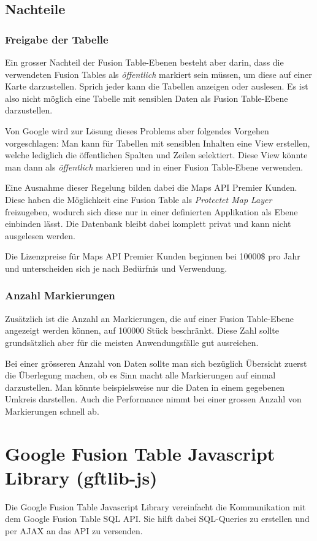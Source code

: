 \subsection{Nachteile}
\subsubsection{Freigabe der Tabelle}
Ein grosser Nachteil der Fusion Table-Ebenen besteht aber darin, dass die verwendeten Fusion Tables als  \emph{öffentlich} markiert sein müssen, um diese auf einer Karte darzustellen. Sprich jeder kann die Tabellen anzeigen oder auslesen. Es ist also nicht möglich eine Tabelle mit sensiblen Daten als Fusion Table-Ebene darzustellen.

Von Google wird zur Lösung dieses Problems aber folgendes Vorgehen vorgeschlagen: Man kann für Tabellen mit sensiblen Inhalten eine View erstellen, welche lediglich die öffentlichen Spalten und Zeilen selektiert. Diese View könnte man dann als \emph{öffentlich} markieren und in einer Fusion Table-Ebene verwenden.

Eine Ausnahme dieser Regelung bilden dabei die Maps API Premier Kunden. Diese haben die Möglichkeit eine Fusion Table als \emph{Protectet Map Layer} freizugeben, wodurch sich diese nur in einer definierten Applikation als Ebene einbinden lässt. Die Datenbank bleibt dabei komplett privat und kann nicht ausgelesen werden.

Die Lizenzpreise für Maps API Premier Kunden beginnen bei 10000\$ pro Jahr und unterscheiden sich je nach Bedürfnis und Verwendung. 

\subsubsection{Anzahl Markierungen}
Zusätzlich ist die Anzahl an Markierungen, die auf einer Fusion Table-Ebene angezeigt werden können, auf 100000 Stück beschränkt. Diese Zahl sollte grundsätzlich aber für die meisten Anwendungsfälle gut ausreichen.

Bei einer grösseren Anzahl von Daten sollte man sich bezüglich Übersicht zuerst die Überlegung machen, ob es Sinn macht alle Markierungen auf einmal darzustellen. Man könnte beispielsweise nur die Daten in einem gegebenen Umkreis darstellen. Auch die Performance nimmt bei einer grossen Anzahl von Markierungen schnell ab.

\section{Google Fusion Table Javascript Library (gftlib-js)}
Die Google Fusion Table Javascript Library vereinfacht die Kommunikation mit dem Google Fusion Table SQL API. Sie hilft dabei SQL-Queries zu erstellen und per AJAX an das API zu versenden.

